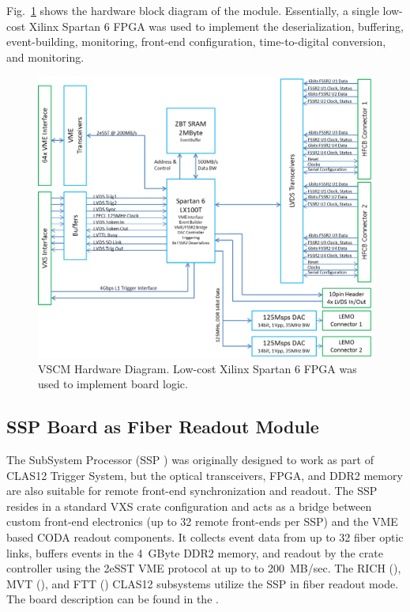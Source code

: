 Fig.~\ref{fig:vscm_blockdiagram} shows the hardware block diagram of the module. Essentially, a single low-cost Xilinx Spartan 6 FPGA was used to implement the deserialization, buffering, event-building, monitoring, front-end configuration, time-to-digital conversion, and monitoring.

\begin{figure}[hbt]
	\centering
	\includegraphics[width=1.0\columnwidth,keepaspectratio]{img/vscm_blockdiagram.png}
	\caption{VSCM Hardware Diagram. Low-cost Xilinx Spartan 6 FPGA was used to implement board logic.}
	\label{fig:vscm_blockdiagram}
\end{figure}


\subsection{SSP Board as Fiber Readout Module}

The SubSystem Processor (SSP \cite{ssp-ref}) was originally designed to work as part of CLAS12 Trigger System, but the optical transceivers, FPGA, and DDR2 memory are also suitable for remote front-end synchronization and readout. The SSP resides in a standard VXS crate configuration and acts as a bridge between custom front-end electronics (up to 32 remote front-ends per SSP) and the VME based CODA readout components. It collects event data from up to 32 fiber optic links, buffers events in the 4~GByte DDR2 memory, and readout by the crate controller using the 2eSST VME protocol at up to to 200~MB/sec. The RICH (\cite{rich-ref}), MVT (\cite{mvt-ref}), and FTT (\cite{ftt-ref}) CLAS12 subsystems utilize the SSP in fiber readout mode. The board description can be found in the \cite{trig-ref}.

